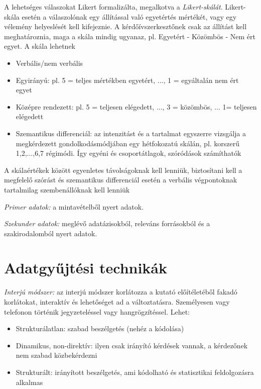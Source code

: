 A lehetséges válaszokat Likert formalizálta, megalkotva a \emph{Likert-skálát}. Likert-skála esetén a válaszolónak egy állítással való egyetértés mértékét, vagy egy vélemény helyeslését kell kifejeznie.  A kérdőívszerkesztőnek csak az állítást kell meghatároznia, maga a skála mindig ugyanaz, pl. Egyetért - Közömbös - Nem ért egyet. A skála lehetnek
\begin{itemize}
\item Verbális/nem verbális
\item Egyirányú: pl. 5 = teljes mértékben egyetért, ..., 1 = egyáltalán nem ért egyet
\item Középre rendezett: pl. 5 = teljesen elégedett, ..., 3 = közömbös, ... 1= teljesen elégedett
\item Szemantikus differenciál: az intenzitást és a tartalmat egyszerre vizsgálja a megkérdezett gondolkodásmódjában egy hétfokozatú skálán, pl. korszerű 1,2,...,6,7 régimódi. Így egyéni és csoportátlagok, szóródások számíthatók
\end{itemize}
A skálaértékek között egyenletes távolságoknak kell lenniük, biztosítani kell a megfelelő szórást és szemantikus differenciál esetén a verbális végpontoknak tartalmilag szembenállóknak kell lenniük

\emph{Primer adatok:} a mintavételből nyert adatok.

\emph{Szekunder adatok:} meglévő adatázisokból, releváns forrásokból és a szakirodalomból nyert adatok.

\section{Adatgyűjtési technikák}

\emph{Interjú módszer:} az interjú módszer korlátozza a kutató előítéletéből fakadó korlátokat, interaktív és lehetőséget ad a változtatásra. Személyesen vagy telefonon történik jegyzeteléssel vagy hangrögzítéssel. Lehet:
\begin{itemize}
\item Strukturálatlan: szabad beszélgetés (nehéz a kódolása)
\item Dinamikus, non-direktív: ilyen csak irányító kérdések vannak, a kérdezőnek nem szabad közbekérdezni
\item Strukturált: irányított beszélgetés, ami kódolható és statisztikai feldolgozásra alkalmas
\end{itemize}

